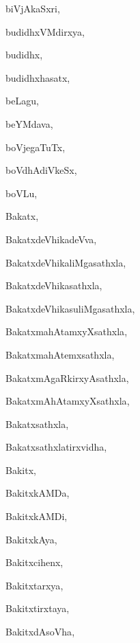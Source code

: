 \begin{multicols}{3}
{\noindent
{biVjAkaSxri}, \pageref{biVjAkaSxri}

\noindent
{budidhxVMdirxya}, \pageref{budidhxVMdirxya}

\noindent
{budidhx}, \pageref{budidhx}

\noindent
{budidhxhasatx}, \pageref{budidhxhasatx}

\noindent
{beLagu}, \pageref{beLagu}

\noindent
{beYMdava}, \pageref{beYMdava}

\noindent
{boVjegaTuTx}, \pageref{boVjegaTuTx}

\noindent
{boVdhAdiVkeSx}, \pageref{boVdhAdiVkeSx}

\noindent
{boVLu}, \pageref{boVLu}

\noindent
{Bakatx}, \pageref{Bakatx}

\noindent
{BakatxdeVhikadeVva}, \pageref{BakatxdeVhikadeVva}

\noindent
{BakatxdeVhikaliMgasathxla}, \pageref{BakatxdeVhikaliMgasathxla}

\noindent
{BakatxdeVhikasathxla}, \pageref{BakatxdeVhikasathxla}

\noindent
{BakatxdeVhikasuliMgasathxla}, \pageref{BakatxdeVhikasuliMgasathxla}

\noindent
{BakatxmahAtamxyXsathxla}, \pageref{BakatxmahAtamxyXsathxla}

\noindent
{BakatxmahAtemxsathxla}, \pageref{BakatxmahAtemxsathxla}

\noindent
{BakatxmAgaRkirxyAsathxla}, \pageref{BakatxmAgaRkirxyAsathxla}

\noindent
{BakatxmAhAtamxyXsathxla}, \pageref{BakatxmAhAtamxyXsathxla}

\noindent
{Bakatxsathxla}, \pageref{Bakatxsathxla}

\noindent
{Bakatxsathxlatirxvidha}, \pageref{Bakatxsathxlatirxvidha}

\noindent
{Bakitx}, \pageref{Bakitx}

\noindent
{BakitxkAMDa}, \pageref{BakitxkAMDa}

\noindent
{BakitxkAMDi}, \pageref{BakitxkAMDi}

\noindent
{BakitxkAya}, \pageref{BakitxkAya}

\noindent
{Bakitxcihenx}, \pageref{Bakitxcihenx}

\noindent
{Bakitxtarxya}, \pageref{Bakitxtarxya}

\noindent
{Bakitxtirxtaya}, \pageref{Bakitxtirxtaya}

\noindent
{BakitxdAsoVha}, \pageref{BakitxdAsoVha}

}
\end{multicols}
